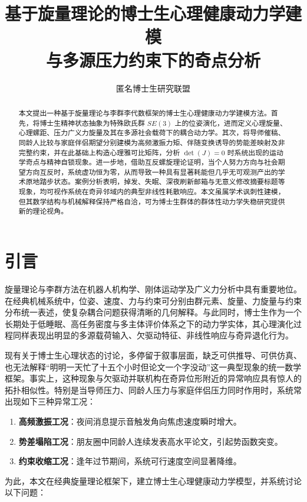 \documentclass[UTF8,twocolumn,a4paper]{ctexart}
\title{\heiti 基于旋量理论的博士生心理健康动力学建模\\与多源压力约束下的奇点分析}
\author{匿名博士生研究联盟}
\date{}
\begin{document}
\maketitle
\begin{abstract}
本文提出一种基于旋量理论与李群李代数框架的博士生心理健康动力学建模方法。首先，将博士生精神状态抽象为特殊欧氏群 $SE(3)$ 上的位姿演化，进而定义心理旋量、心理螺距、压力广义力旋量及其在多源社会载荷下的耦合动力学。其次，将导师催稿、同龄人比较与家庭伴侣期望分别建模为高频激振力矩、伴随变换诱导的势能差映射及非完整约束，并在此基础上构造心理雅可比矩阵，分析 $\det(J)=0$ 时系统出现的运动学奇点与精神自锁现象。进一步地，借助互反螺旋理论证明，当个人努力方向与社会期望方向互反时，系统虚功恒为零，从而导致一种具有显著耗能但几乎无可观测产出的学术原地踏步状态。案例分析表明，掉发、失眠、深夜刷新邮箱与无意义修改摘要标题等现象，均可视作系统在奇异邻域内的典型非线性耗散响应。本文虽属学术讽刺性建模，但其数学结构与机械解释保持严格自洽，可为博士生群体的群体性动力学失稳研究提供新的理论视角。
\end{abstract}

\section{引言}

旋量理论与李群方法在机器人机构学、刚体运动学及广义力分析中具有重要地位\cite{ball,murray,lynch,angeles}。在经典机械系统中，位姿、速度、力与约束可分别由群元素、旋量、力旋量与约束分布统一表述，使复杂耦合问题获得清晰的几何解释。与此同时，博士生作为一个长期处于低睡眠、高任务密度与多主体评价体系之下的动力学实体，其心理演化过程同样表现出明显的多源载荷输入、欠驱动特征、非线性响应与奇异退化行为。

现有关于博士生心理状态的讨论，多停留于叙事层面，缺乏可供推导、可供仿真、也无法解释“明明一天忙了十五个小时但论文一个字没动”这一典型现象的统一数学框架。事实上，这种现象与欠驱动并联机构在奇异位形附近的异常响应具有惊人的拓扑相似性。特别是当导师压力、同龄人压力与家庭伴侣压力同时作用时，系统常出现如下三种异常工况：

\begin{enumerate}
  \item \textbf{高频激振工况}：夜间消息提示音触发角向焦虑速度瞬时增大。
  \item \textbf{势差塌陷工况}：朋友圈中同龄人连续发表高水平论文，引起势函数突变。
  \item \textbf{约束收缩工况}：逢年过节期间，系统可行速度空间显著降维。
\end{enumerate}

为此，本文在经典旋量理论框架下，建立博士生心理健康动力学模型，并系统讨论以下问题：
\end{document}
